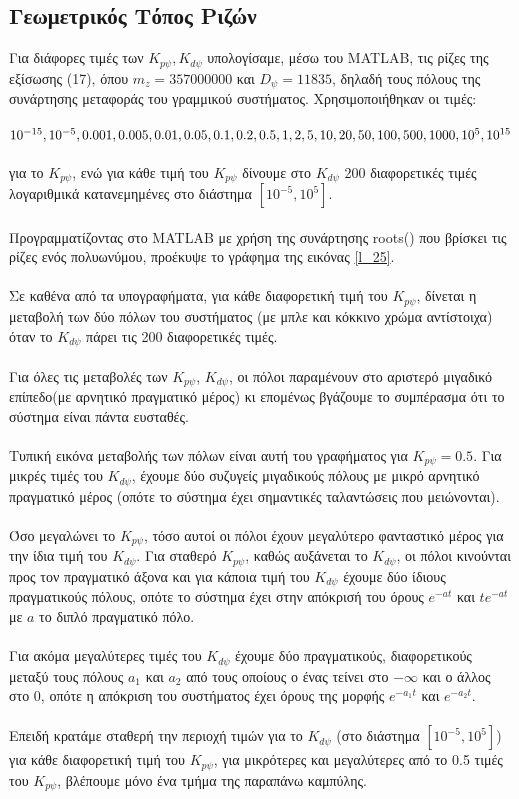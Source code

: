 \documentclass{article}
\begin{document}
\subsection{Γεωμετρικός Τόπος Ριζών}
Για διάφορες τιμές των \(K_{p\psi}, K_{d\psi}\) υπολογίσαμε, μέσω του MATLAB, τις ρίζες της εξίσωσης (17), όπου \(m_z = 357000000\) και \(D_\psi = 11835\), δηλαδή τους πόλους της συνάρτησης μεταφοράς του γραμμικού συστήματος. Χρησιμοποιήθηκαν οι τιμές:\\\\ \(10^{-15}, 10^{-5}, 0.001, 0.005, 0.01, 0.05, 0.1, 0.2, \\0.5, 1, 2, 5, 10, 20, 50, 100, 500, 1000, 10^5, 10^{15}\)
\\\\για το \(K_{p\psi}\), ενώ για κάθε τιμή του \(K_{p\psi}\) δίνουμε στο \(K_{d\psi}\) 200 διαφορετικές τιμές λογαριθμικά κατανεμημένες στο διάστημα \([10^{-5}, 10^{5}]\).
\\\\Προγραμματίζοντας στο MATLAB με χρήση της συνάρτησης roots() που βρίσκει τις ρίζες ενός πολυωνύμου, προέκυψε το γράφημα της εικόνας \ref{l_25}.
\\\\Σε καθένα από τα υπογραφήματα, για κάθε διαφορετική τιμή του \(K_{p\psi}\), δίνεται η μεταβολή των δύο πόλων του συστήματος (με μπλε και κόκκινο χρώμα αντίστοιχα) όταν το \(K_{d\psi}\) πάρει τις 200 διαφορετικές τιμές.
\\\\Για όλες τις μεταβολές των \(K_{p\psi}\), \(K_{d\psi}\), οι πόλοι παραμένουν στο αριστερό μιγαδικό επίπεδο(με αρνητικό πραγματικό μέρος) κι επομένως βγάζουμε το συμπέρασμα ότι το σύστημα είναι πάντα ευσταθές.
\\\\Τυπική εικόνα μεταβολής των πόλων είναι αυτή του γραφήματος για \(K_{p\psi} = 0.5\). Για μικρές τιμές του \(K_{d\psi}\), έχουμε δύο συζυγείς μιγαδικούς πόλους με μικρό αρνητικό πραγματικό μέρος (οπότε το σύστημα έχει σημαντικές ταλαντώσεις που μειώνονται). \\\\Όσο μεγαλώνει το \(K_{p\psi}\), τόσο αυτοί οι πόλοι έχουν μεγαλύτερο φανταστικό μέρος για την ίδια τιμή του \(K_{d\psi}\). Για σταθερό \(K_{p\psi}\), καθώς αυξάνεται το \(K_{d\psi}\), οι πόλοι κινούνται προς τον πραγματικό άξονα και για κάποια τιμή του \(K_{d\psi}\) έχουμε δύο ίδιους πραγματικούς πόλους, οπότε το σύστημα έχει στην απόκρισή του όρους \(e^{-at}\) και \(te^{-at}\) με \(a\) το διπλό πραγματικό πόλο. \\\\Για ακόμα μεγαλύτερες τιμές του \(K_{d\psi}\) έχουμε δύο πραγματικούς, διαφορετικούς μεταξύ τους πόλους \(a_1\) και \(a_2\) από τους οποίους ο ένας τείνει στο \(-\infty\) και ο άλλος στο 0, οπότε η απόκριση του συστήματος έχει όρους της μορφής \(e^{-a_1t}\) και \(e^{-a_2t}\).\\\\Επειδή κρατάμε σταθερή την περιοχή τιμών για το \(K_{d\psi}\) (στο διάστημα \([10^{-5}, 10^{5}]\)) για κάθε διαφορετική τιμή του \(K_{p\psi}\), για μικρότερες και μεγαλύτερες από το 0.5 τιμές του  \(K_{p\psi}\), βλέπουμε μόνο ένα τμήμα της παραπάνω καμπύλης.
\end{document}
